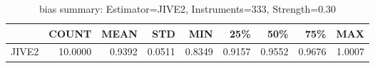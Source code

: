 \begin{table}[ht]
\centering
\caption{bias summary: Estimator=JIVE2, Instruments=333, Strength=0.30}
\begin{tabular}{lrrrrrrrr}
\toprule
 & COUNT & MEAN & STD & MIN & 25\% & 50\% & 75\% & MAX \\
\midrule
JIVE2 & 10.0000 & 0.9392 & 0.0511 & 0.8349 & 0.9157 & 0.9552 & 0.9676 & 1.0007 \\
\bottomrule
\end{tabular}
\end{table}

